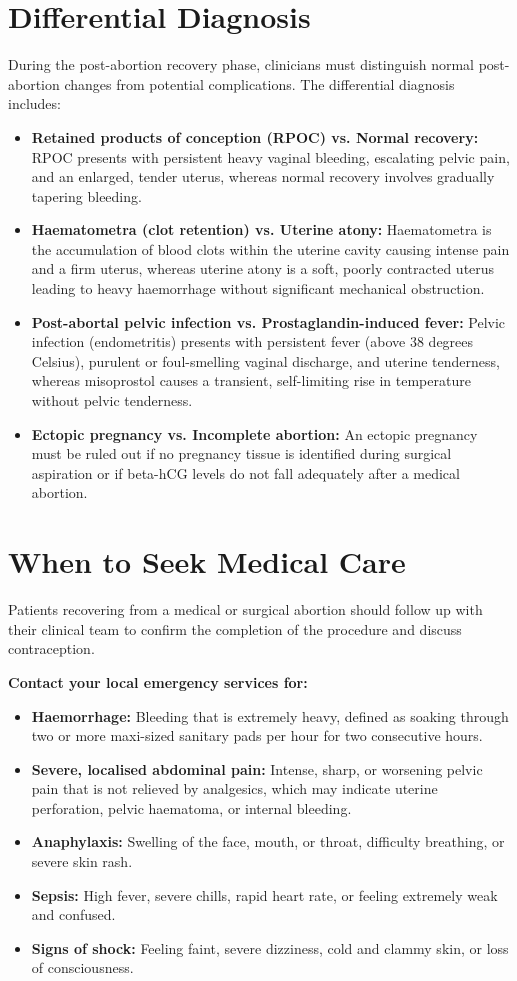 \section*{Differential Diagnosis}
During the post-abortion recovery phase, clinicians must distinguish normal post-abortion changes from potential complications. The differential diagnosis includes:
\begin{itemize}
    \item \textbf{Retained products of conception (RPOC) vs. Normal recovery:} RPOC presents with persistent heavy vaginal bleeding, escalating pelvic pain, and an enlarged, tender uterus, whereas normal recovery involves gradually tapering bleeding.
    \item \textbf{Haematometra (clot retention) vs. Uterine atony:} Haematometra is the accumulation of blood clots within the uterine cavity causing intense pain and a firm uterus, whereas uterine atony is a soft, poorly contracted uterus leading to heavy haemorrhage without significant mechanical obstruction.
    \item \textbf{Post-abortal pelvic infection vs. Prostaglandin-induced fever:} Pelvic infection (endometritis) presents with persistent fever (above 38 degrees Celsius), purulent or foul-smelling vaginal discharge, and uterine tenderness, whereas misoprostol causes a transient, self-limiting rise in temperature without pelvic tenderness.
    \item \textbf{Ectopic pregnancy vs. Incomplete abortion:} An ectopic pregnancy must be ruled out if no pregnancy tissue is identified during surgical aspiration or if beta-hCG levels do not fall adequately after a medical abortion.
\end{itemize}

\section*{When to Seek Medical Care}
Patients recovering from a medical or surgical abortion should follow up with their clinical team to confirm the completion of the procedure and discuss contraception.

\textbf{Contact your local emergency services for:}
\begin{itemize}
    \item \textbf{Haemorrhage:} Bleeding that is extremely heavy, defined as soaking through two or more maxi-sized sanitary pads per hour for two consecutive hours.
    \item \textbf{Severe, localised abdominal pain:} Intense, sharp, or worsening pelvic pain that is not relieved by analgesics, which may indicate uterine perforation, pelvic haematoma, or internal bleeding.
    \item \textbf{Anaphylaxis:} Swelling of the face, mouth, or throat, difficulty breathing, or severe skin rash.
    \item \textbf{Sepsis:} High fever, severe chills, rapid heart rate, or feeling extremely weak and confused.
    \item \textbf{Signs of shock:} Feeling faint, severe dizziness, cold and clammy skin, or loss of consciousness.
\end{itemize}

